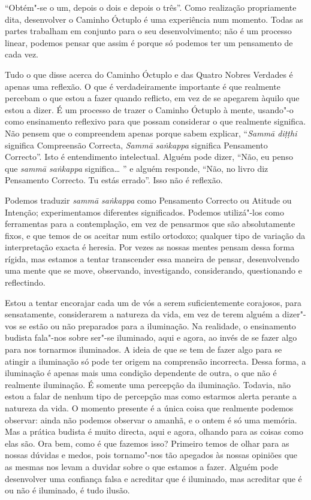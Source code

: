 “Obtém"-se o um, depois o dois e depois o três”. Como realização propriamente
dita, desenvolver o Caminho Óctuplo é uma experiência num momento. Todas as
partes trabalham em conjunto para o seu desenvolvimento; não é um processo
linear, podemos pensar que assim é porque só podemos ter um pensamento de cada
vez.

Tudo o que disse acerca do Caminho Óctuplo e das Quatro Nobres Verdades é apenas
uma reflexão. O que é verdadeiramente importante é que realmente percebam o que
estou a fazer quando reflicto, em vez de se apegarem àquilo que estou a dizer. É
um processo de trazer o Caminho Óctuplo à mente, usando"-o como ensinamento
reflexivo para que possam considerar o que realmente significa. Não pensem que o
compreendem apenas porque sabem explicar, “\emph{Sammā diṭṭhi} significa
Compreensão Correcta, \emph{Sammā saṅkappa} significa Pensamento Correcto”.
Isto é entendimento intelectual. Alguém pode dizer, “Não, eu penso que
\emph{sammā saṅkappa} significa\ldots{} ” e alguém responde, “Não, no livro diz
Pensamento Correcto. Tu estás errado”. Isso não é reflexão.

Podemos traduzir \emph{sammā saṅkappa} como Pensamento Correcto ou Atitude ou
Intenção; experimentamos diferentes \mbox{significados}. Podemos utilizá"-los como
ferramentas para a contemplação, em vez de pensarmos que são absolutamente
fixos, e que temos de os aceitar num estilo ortodoxo; qualquer tipo de variação
da interpretação exacta é heresia. Por vezes as nossas mentes pensam dessa forma
rígida, mas estamos a tentar transcender essa maneira de pensar, desenvolvendo
uma mente que se move, observando, investigando, considerando, questionando e
reflectindo.

Estou a tentar encorajar cada um de vós a serem suficientemente corajosos, para
sensatamente, considerarem a natureza da vida, em vez de terem alguém a
dizer"-vos se estão ou não preparados para a iluminação. Na realidade, o
ensinamento budista fala"-nos sobre ser"-se iluminado, aqui e agora, ao invés de
se fazer algo para nos tornarmos iluminados. A ideia de que se tem de fazer algo
para se atingir a iluminação só pode ter origem na comprensão incorrecta.
Dessa forma, a iluminação é apenas mais uma condição dependente de outra, o que
não é realmente iluminação. É somente uma percepção da iluminação. Todavia, não
estou a falar de nenhum tipo de percepção mas como estarmos alerta perante a
natureza da vida. O momento presente é a única coisa que realmente podemos
observar: ainda não podemos observar o amanhã, e o ontem é só uma memória. Mas a
prática budista é muito directa, aqui e agora, olhando para as coisas como elas
são. Ora bem, como é que fazemos isso? Primeiro temos de olhar para as nossas
dúvidas e medos, pois tornamo"-nos tão apegados às nossas opiniões que as mesmas
nos levam a duvidar sobre o que estamos a fazer. Alguém pode desenvolver uma
confiança falsa e acreditar que é iluminado, mas acreditar que é ou não é
iluminado, é tudo ilusão.

